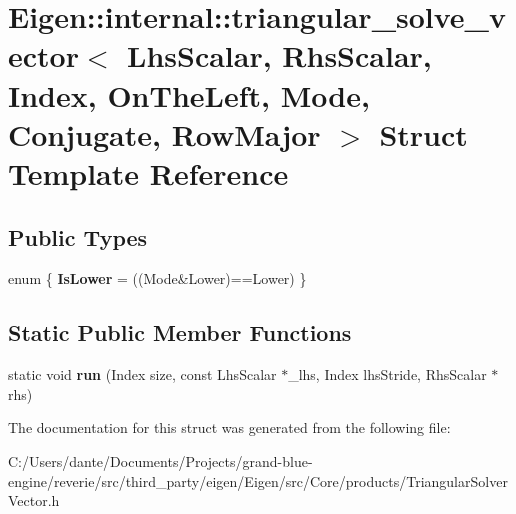 \hypertarget{struct_eigen_1_1internal_1_1triangular__solve__vector_3_01_lhs_scalar_00_01_rhs_scalar_00_01_ind05791747bf7342daa3286389f182e45b}{}\section{Eigen\+::internal\+::triangular\+\_\+solve\+\_\+vector$<$ Lhs\+Scalar, Rhs\+Scalar, Index, On\+The\+Left, Mode, Conjugate, Row\+Major $>$ Struct Template Reference}
\label{struct_eigen_1_1internal_1_1triangular__solve__vector_3_01_lhs_scalar_00_01_rhs_scalar_00_01_ind05791747bf7342daa3286389f182e45b}
\subsection*{Public Types}
\begin{DoxyCompactItemize}
\item 
\mbox{\label{struct_eigen_1_1internal_1_1triangular__solve__vector_3_01_lhs_scalar_00_01_rhs_scalar_00_01_ind05791747bf7342daa3286389f182e45b_aefb83c2bad98f50bd38e36f6e44118d3}} 
enum \{ {\bfseries Is\+Lower} = ((Mode\&Lower)==Lower)
 \}
\end{DoxyCompactItemize}
\subsection*{Static Public Member Functions}
\begin{DoxyCompactItemize}
\item 
\mbox{\label{struct_eigen_1_1internal_1_1triangular__solve__vector_3_01_lhs_scalar_00_01_rhs_scalar_00_01_ind05791747bf7342daa3286389f182e45b_a076e86f3709acd78edb5fa1534ab8909}} 
static void {\bfseries run} (Index size, const Lhs\+Scalar $\ast$\+\_\+lhs, Index lhs\+Stride, Rhs\+Scalar $\ast$rhs)
\end{DoxyCompactItemize}


The documentation for this struct was generated from the following file\+:\begin{DoxyCompactItemize}
\item 
C\+:/\+Users/dante/\+Documents/\+Projects/grand-\/blue-\/engine/reverie/src/third\+\_\+party/eigen/\+Eigen/src/\+Core/products/Triangular\+Solver\+Vector.\+h\end{DoxyCompactItemize}
